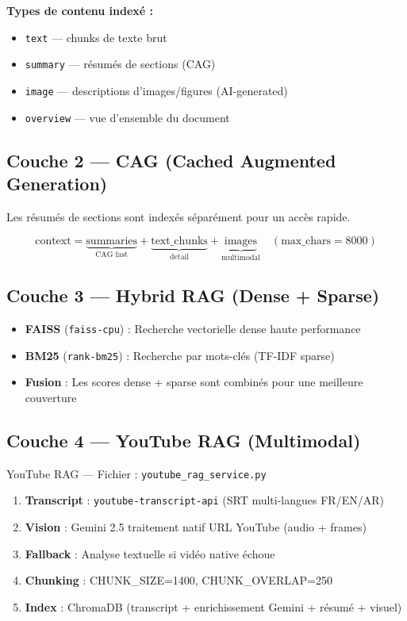 \documentclass[12pt,a4paper]{article}
\begin{document}
\textbf{Types de contenu indexé :}
\begin{itemize}[noitemsep]
  \item \texttt{text} --- chunks de texte brut
  \item \texttt{summary} --- résumés de sections (CAG)
  \item \texttt{image} --- descriptions d'images/figures (AI-generated)
  \item \texttt{overview} --- vue d'ensemble du document
\end{itemize}

\subsection{Couche 2 --- CAG (Cached Augmented Generation)}

Les résumés de sections sont indexés séparément pour un accès rapide.

\[
\text{context} = \underbrace{\text{summaries}}_{\text{CAG fast}} + \underbrace{\text{text\_chunks}}_{\text{detail}} + \underbrace{\text{images}}_{\text{multimodal}} \quad (\text{max\_chars}=8000)
\]

\subsection{Couche 3 --- Hybrid RAG (Dense + Sparse)}

\begin{itemize}
  \item \textbf{FAISS} (\texttt{faiss-cpu}) : Recherche vectorielle dense haute performance
  \item \textbf{BM25} (\texttt{rank-bm25}) : Recherche par mots-clés (TF-IDF sparse)
  \item \textbf{Fusion} : Les scores dense + sparse sont combinés pour une meilleure couverture
\end{itemize}

\subsection{Couche 4 --- YouTube RAG (Multimodal)}

\begin{agentbox}{YouTube RAG --- Fichier : \texttt{youtube\_rag\_service.py}}
\begin{enumerate}[noitemsep]
  \item \textbf{Transcript} : \texttt{youtube-transcript-api} (SRT multi-langues FR/EN/AR)
  \item \textbf{Vision} : Gemini 2.5 traitement natif URL YouTube (audio + frames)
  \item \textbf{Fallback} : Analyse textuelle si vidéo native échoue
  \item \textbf{Chunking} : CHUNK\_SIZE=1400, CHUNK\_OVERLAP=250
  \item \textbf{Index} : ChromaDB (transcript + enrichissement Gemini + résumé + visuel)
\end{enumerate}
\end{agentbox}
\end{document}
